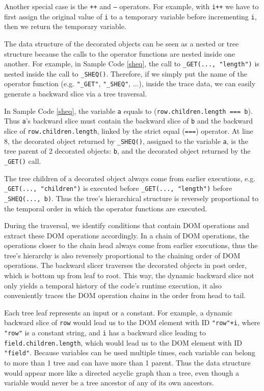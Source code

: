 Another special case is the {\tt ++} and {\tt ---} operators.  
For example, with {\tt i++} we have to first assign the original value of {\tt i} to a temporary variable before incrementing {\tt i}, then we return the temporary variable.


The data structure of the decorated objects can be seen as a nested or tree structure because the calls to the operator functions are nested inside one another.  
For example, in Sample Code \ref{sheq}, the call to {\tt \_GET(..., "length")} is nested inside the call to {\tt \_SHEQ()}.  
Therefore, if we simply put the name of the operator function (e.g. {\tt "\_GET"}, {\tt "\_SHEQ"}, ...), inside the trace data, we can easily generate a backward slice via a tree traversal.  

In Sample Code \ref{sheq}, the variable {\tt a} equals to ({\tt row.children.length === b}).  
Thus {\tt a}'s backward slice must contain the backward slice of {\tt b} and the backward slice of {\tt row.children.length}, linked by the strict equal ({\tt ===}) operator.  
At line 8, the decorated object returned by {\tt \_SHEQ()}, assigned to the variable {\tt a}, is the tree parent of 2 decorated objects: {\tt b}, and the decorated object returned by the {\tt \_GET()} call.  

The tree children of a decorated object always come from earlier executions, e.g. {\tt \_GET(..., "children")} is executed before {\tt \_GET(..., "length")} before {\tt \_SHEQ(..., b)}.
Thus the tree's hierarchical structure is reversely proportional to the temporal order in which the operator functions are executed.  

During the traversal, we identify conditions that contain DOM operations and extract these DOM operations accordingly.  
In a chain of DOM operations, the operations closer to the chain head always come from earlier executions, thus the tree's hierarchy is also reversely proportional to the chaining order of DOM operations.  
The backward slicer traverses the decorated objects in post order, which is bottom up from leaf to root.  
This way, the dynamic backward slice not only yields a temporal history of the code's runtime execution, it also conveniently traces the DOM operation chains in the order from head to tail.

Each tree leaf represents an input or a constant.  
For example, a dynamic backward slice of {\tt row} would lead us to the DOM element with ID {\tt "row"+i}, where {\tt "row"} is a constant string, 
and {\tt i} has a backward slice leading to {\tt field.children.length}, which would lead us to the DOM element with ID {\tt "field"}.  
Because variables can be used multiple times, each variable can belong to more than 1 tree and can have more than 1 parent.  
Thus the data structure would appear more like a directed acyclic graph than a tree, even though a variable would never be a tree ancestor of any of its own ancestors.  

